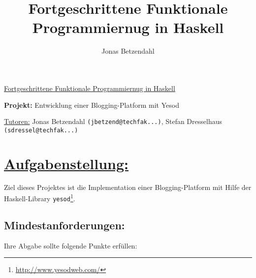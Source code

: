 \documentclass[10pt,a4paper]{article}
\author{Jonas Betzendahl}
\title{Fortgeschrittene Funktionale Programmiernug in Haskell}
\begin{document}
\huge \underline{Fortgeschrittene Funktionale Programmiernug in Haskell}\smallskip

\Large
\begin{center}
\textbf{Projekt:} Entwicklung einer Blogging-Platform mit Yesod\bigskip

\normalsize
\underline{Tutoren:}
Jonas Betzendahl \texttt{(jbetzend@techfak...)},
Stefan Dresselhaus \texttt{(sdressel@techfak...)}
\end{center}
\normalsize

\section*{\underline{Aufgabenstellung:}}

Ziel dieses Projektes ist die Implementation einer Blogging-Platform mit Hilfe der Haskell-Library \texttt{yesod}\footnote{\url{http://www.yesodweb.com/}}.

\subsection*{Mindestanforderungen:}

Ihre Abgabe sollte folgende Punkte erfüllen:\bigskip
\end{document}
